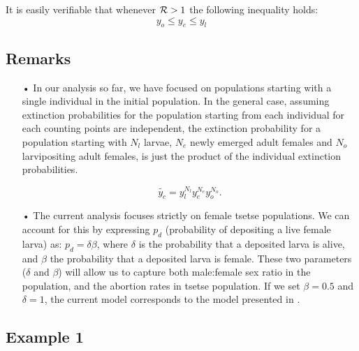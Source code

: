 \documentclass[smallextended]{svjour3}
\begin{document}
It is easily verifiable that whenever ${\cal R}>1$ the following inequality holds:
\begin{equation}
	\label{Aretsetsetheorem}
	y_{o}\leq y_{e} \leq y_{l}
\end{equation} 


\subsection*{\bf Remarks}
\begin{itemize}
	\item[•] In our analysis so far, we have focused on populations starting with a single individual in the initial population. In the general case, assuming extinction probabilities for the population starting from each individual for each counting points are independent, the extinction probability for a population starting with $N_l$ larvae, $N_e$ newly emerged adult females and $N_o$ larvipositing adult females, is just the product of the individual extinction probabilities. 
	
	$$\tilde{y_c}=y_l^{N_l} y_e^{N_e} y_o^{N_o}.$$

	\item[•] The current analysis focuses strictly on female tsetse populations. We can account for this  by expressing  $p_d$ (probability of depositing a live female larva) as:  $p_d =\delta \beta$, where $\delta$ is the probability that a deposited larva is alive, and $\beta$ the probability that a deposited larva is female.  These two parameters ($\delta$ and $\beta$) will allow us to capture both male:female sex ratio in the population, and  the abortion rates in tsetse population.  If we set $\beta = 0.5$ and $\delta = 1$, the current model corresponds to the model presented in \cite{Hargrove2005a}. 
\end{itemize}

\subsection{Example 1}
\end{document}
